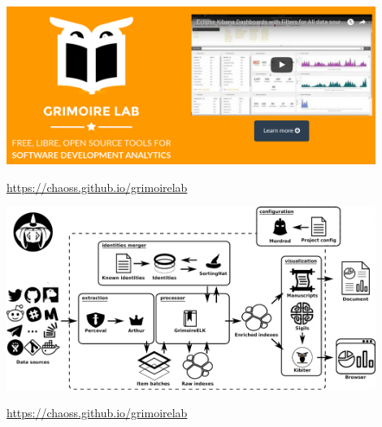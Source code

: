 \documentclass[17pt,aspectratio=169,hyperref=pdfusetitle]{beamer}
\begin{document}




\begin{frame}


  \includegraphics[width=12cm]{figs/grimoirelab}

  \begin{flushright}
  \url{https://chaoss.github.io/grimoirelab}
  \end{flushright}

\end{frame}


\begin{frame}

\begin{center}
  \includegraphics[width=12cm]{figs/grimoirelab-arquitecture}
\end{center}

\begin{flushright}
  \url{https://chaoss.github.io/grimoirelab}
\end{flushright}
\end{frame}
\end{document}
